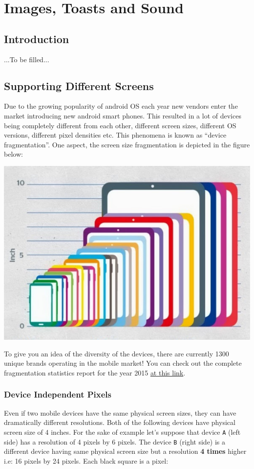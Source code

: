 \chapter{Images, Toasts and Sound}

\section{Introduction}
...To be filled...

\section{Supporting Different Screens}
\label{lec7:supportDiffScreens}
Due to the growing popularity of android OS each year new vendors enter the market introducing new android smart phones. This resulted in a lot of devices being completely different from each other, different screen sizes, different OS versions, different pixel densities etc. This phenomena is known as ``device fragmentation''. One aspect, the screen size fragmentation is depicted in the figure below:

\begin{center}
	\includegraphics[scale=0.4]{chapters/ch06/images/1}
\end{center} 

To give you an idea of the diversity of the devices, there are currently 1300 unique brands operating in the mobile market! You can check out the complete fragmentation statistics report for the year 2015 \href{http://opensignal.com/reports/2015/08/android-fragmentation/}{at this link}. 

\subsection{Device Independent Pixels}
\label{lec07:dp}
Even if two mobile devices have the same physical screen sizes, they can have dramatically different resolutions. Both of the following devices have physical screen size of 4 inches. For the sake of example let's suppose that device \texttt{A} (left side) has a resolution of 4 pixels by 6 pixels. The device \texttt{B} (right side) is a different device having same physical screen size but a resolution \textbf{4 times} higher i.e: 16 pixels by 24 pixels. Each black square is a pixel:

